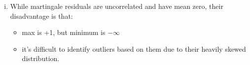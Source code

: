 \begin{enumerate}[(a)]
\begin{enumerate}[(i)]
In \verb|R|, once an \verb|coxph| is saved, we can easily get the Martingale residuals using the \verb|residuals| function. Please, see \verb|?residuals.coxph| for more details. Also, to compute the linear predictor (i.e., $\mathbf{z}_{i}^{T}\hat{\boldsymbol{\beta}}$), we can use the function \verb|predict| (see \verb|?predict.coxph|).  
\begin{figure}[htbp]
	\centering
		\texttt{[image: mgale.pdf]}
	\caption{Martingale residuals vs linear prediction.}
	\label{figure2}
\end{figure}
\begin{spacing}{1.2}
\begin{footnotesize}
\begin{verbatim}
> # b-(ii): Martingale Residuals
> mac$mg = residuals(fit,type = "martingale")
> mac$betaz = predict(fit,type = "lp")
> 
> pdf("mgale.pdf",height = 5,width = 5)
> plot(mg ~ betaz,data = mac,xlab = "Linear prediction",
+      ylab = "Martingale residuals")
> dev.off()
\end{verbatim}
\end{footnotesize}
\end{spacing}
\item While martingale residuals are uncorrelated
and have mean zero, their disadvantage is that:
\begin{itemize}
\item max is +1, but minimum is $-\infty$
\item it's difficult to identify outliers based on them due to their heavily skewed distribution. 
\end{itemize}


\end{enumerate}
\end{enumerate}
